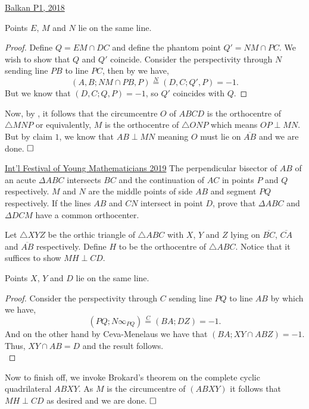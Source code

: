 \begin{problem}{3}{\href{https://artofproblemsolving.com/community/u571929h1640635p35544553}{Balkan P1, 2018}}
\begin{numsolution}{2}
	\begin{claim}
		Points $E$, $M$ and $N$ lie on the same line.
	\end{claim}
	\begin{proof} Define $Q=EM\cap DC$ and define the phantom point $Q'=NM\cap PC$. We wish to show that $Q$ and $Q'$ coincide. Consider the perspectivity through $N$ sending line $PB$ to line $PC$, then by  we have,
$$(A,B; NM\cap PB, P)\overset{N}{=}(D, C; Q', P)=-1.$$But we know that $(D,C; Q,P)=-1$, so $Q'$ coincides with $Q$.
	\end{proof}
	
	\indent Now, by , it follows that the circumcentre $O$ of $ABCD$ is the orthocentre of $\triangle MNP$ or equivalently, $M$ is the orthocentre of $\triangle ONP$ which means $OP\perp MN$. But by claim $1$, we know that $AB\perp MN$ meaning $O$ must lie on $\overline{AB}$ and we are done. $\qedwhite$
	\end{numsolution}
\end{problem}
	
\begin{problem}{4}{\href{https://artofproblemsolving.com/community/q2h1920217p35604706}{Int'l Festival of Young Mathematicians 2019}} 
	The perpendicular bisector of $AB$ of an acute $\Delta ABC$ intersects $BC$ and the continuation of $AC$ in points $P$ and $Q$ respectively. $M$ and $N$ are the middle points of side $AB$ and segment $PQ$ respectively. If the lines $AB$ and $CN$ intersect in point $D$, prove that $\Delta ABC$ and $\Delta DCM$ have a common orthocenter.
	\begin{solution} Let $\triangle XYZ$ be the orthic triangle of $\triangle ABC$ with $X$, $Y$ and $Z$ lying on $\overline{BC}$, $\overline{CA}$ and $\overline{AB}$ respectively. Define $H$ to be the orthocentre of $\triangle ABC$. Notice that it suffices to show $MH\perp CD$.

	\begin{numclaim}{1} Points $X$, $Y$ and $D$ lie on the same line.
		\end{numclaim}
	\begin{proof} Consider the perspectivity through $C$ sending line $PQ$ to line $AB$ by which we have,
$$(PQ; N\infty_{PQ})\overset{C}{=}(BA; DZ)=-1.$$And on the other hand by Ceva-Menelaus we have that $(BA; XY\cap AB Z)=-1$. Thus, $XY\cap AB=D$ and the result follows.\\
	\end{proof}
	
	Now to finish off, we invoke Brokard's theorem on the complete cyclic quadrilateral $ABXY$. As $M$ is the circumcentre of $(ABXY)$ it follows that $MH\perp CD$ as desired and we are done. $\qedwhite$
	\end{solution}
	\end{problem}
	
